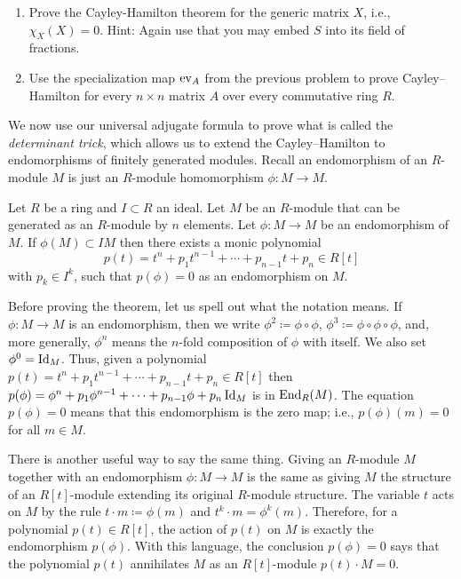 \documentclass[12pt,reqno]{amsart}
\begin{document}
\begin{enumerate}[leftmargin=*, resume=problems]
\begin{enumerate}
    \item Prove the Cayley-Hamilton theorem for the generic matrix $X$, i.e., $\chi_{X}(X)=0$. Hint: Again use that you may embed $S$ into its field of fractions. 
    \item Use the specialization map $\operatorname{ev}_A$  from the previous problem to prove Cayley--Hamilton for every $n\times n$ matrix $A$ over every commutative ring $R$.
\end{enumerate}
\end{enumerate}

\hrulefill

We now use our universal adjugate formula to prove what is called the \emph{determinant trick}, which allows us to extend the Cayley--Hamilton to endomorphisms of finitely generated modules. Recall an endomorphism of an $R$-module $M$ is just an $R$-module homomorphism $\phi:M \to M$. 

\begin{theorem}
	Let $R$ be a ring and $I\subset R$ an ideal.  Let $M$ be an $R$-module that can be generated as an $R$-module by $n$ elements. Let $\phi:M\to M$ be an endomorphism of $M$. If $\phi(M) \subset IM$ then there exists a monic polynomial
	\[
	p(t) = t^{n} + p_{1}t^{n-1}+\cdots+p_{n-1}t+p_{n} \in R[t]
	\]
	with $p_{k} \in I^{k}$, such that $p(\phi)=0$ as an endomorphism on $M$. 
\end{theorem}


Before proving the theorem, let us spell out what the notation means. If $\phi:M\to M$ is an endomorphism, then we write $\phi^{2}\coloneqq \phi\circ \phi$, $\phi^{3}\coloneqq \phi\circ\phi\circ\phi$, and, more generally, $\phi^n$ means the $n$-fold composition of $\phi$ with itself. We also set $\phi^0=\operatorname{Id}_M$. Thus, given a polynomial $p(t)=t^{n} + p_{1}t^{n-1}+\cdots+p_{n-1}t+p_{n}\in R[t]$ then $p(\phi)=\phi^{n} + p_{1}\phi^{n-1}+\cdots+p_{n-1}\phi+p_{n}\operatorname{Id}_{M}$ is in $\operatorname{End}_{R}(M)$. The equation $p(\phi)=0$ means that this endomorphism is the zero map; i.e., $p(\phi)(m)=0$ for all $m\in M$. 

There is another useful way to say the same thing. Giving an $R$-module $M$ together with an endomorphism $\phi:M\to M$ is the same as giving $M$ the structure of an $R[t]$-module extending its original $R$-module structure. The variable $t$ acts on $M$ by the rule $t\cdot m \coloneqq \phi(m)$ and $t^k\cdot m=\phi^k(m)$. Therefore, for a polynomial $p(t)\in R[t]$, the action of $p(t)$ on $M$ is exactly the endomorphism $p(\phi)$. With this language, the conclusion $p(\phi)=0$ says that the polynomial $p(t)$ annihilates $M$ as an $R[t]$-module $p(t)\cdot M=0$. 
\end{document}
